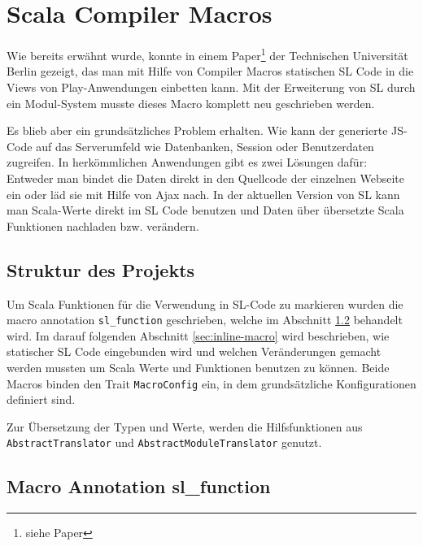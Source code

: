 \documentclass[12pt]{scrreprt}
\begin{document}
\chapter{Scala Compiler Macros}
\label{chap:scala-compiler-macros}

Wie bereits erwähnt wurde, konnte in einem Paper\footnote{siehe Paper} der Technischen Universität Berlin gezeigt, das man mit Hilfe von Compiler Macros statischen \ac{SL} Code in die Views von Play-Anwendungen einbetten kann. Mit der Erweiterung von \ac{SL} durch ein Modul-System musste dieses Macro komplett neu geschrieben werden.

Es blieb aber ein grundsätzliches Problem erhalten. Wie kann der generierte \ac{JS}-Code auf das Serverumfeld wie Datenbanken, Session oder Benutzerdaten zugreifen. In herkömmlichen Anwendungen gibt es zwei Lösungen dafür: Entweder man bindet die Daten direkt in den Quellcode der einzelnen Webseite ein oder läd sie mit Hilfe von Ajax nach. In der aktuellen Version von \ac{SL} kann man Scala-Werte direkt im \ac{SL} Code benutzen und Daten über übersetzte Scala Funktionen nachladen bzw. verändern.

\section{Struktur des Projekts}
\label{sec:project-structure}

Um Scala Funktionen für die Verwendung in \ac{SL}-Code zu markieren wurden die macro annotation \lstinline!sl_function! geschrieben, welche im Abschnitt \ref{sec:annotation-macro} behandelt wird. Im darauf folgenden Abschnitt \ref{sec:inline-macro} wird beschrieben, wie statischer \ac{SL} Code eingebunden wird und welchen Veränderungen gemacht werden mussten um Scala Werte und Funktionen benutzen zu können. Beide Macros binden den Trait \lstinline!MacroConfig! ein, in dem grundsätzliche Konfigurationen definiert sind. 


Zur Übersetzung der Typen und Werte, werden die Hilfsfunktionen aus \lstinline!AbstractTranslator! und \lstinline!AbstractModuleTranslator! genutzt.


\section{Macro Annotation sl\_function }
\label{sec:annotation-macro}
\end{document}
